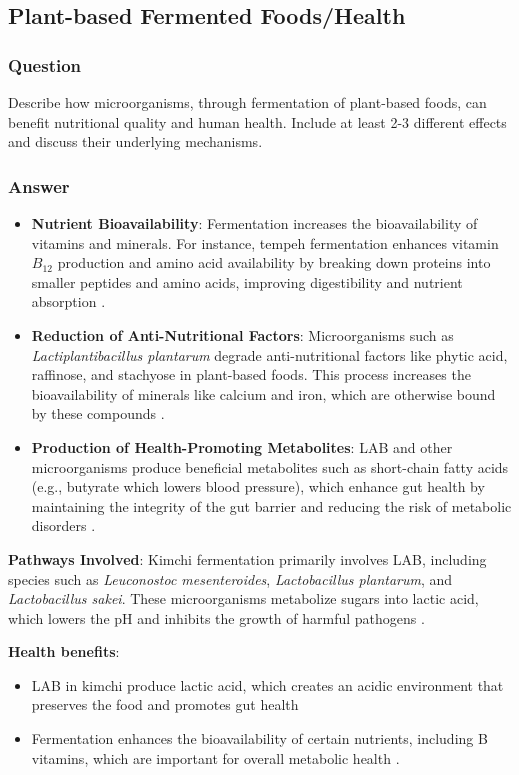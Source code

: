 \subsection{Plant-based Fermented Foods/Health}
\subsubsection*{Question}
Describe how microorganisms, through fermentation of plant-based foods, can benefit nutritional quality and human health. Include at least 2-3 different effects and discuss their underlying mechanisms. 

\subsubsection*{Answer}
\begin{itemize}
    \item \textbf{Nutrient Bioavailability}: Fermentation increases the bioavailability of vitamins and minerals. For instance, tempeh fermentation enhances vitamin $B_{12}$ production and amino acid availability by breaking down proteins into smaller peptides and amino acids, improving digestibility and nutrient absorption \cite*{LS22}.
    \item \textbf{Reduction of Anti-Nutritional Factors}: Microorganisms such as \textit{Lactiplantibacillus plantarum} degrade anti-nutritional factors like phytic acid, raffinose, and stachyose in plant-based foods. This process increases the bioavailability of minerals like calcium and iron, which are otherwise bound by these compounds \cite*{LS22}.
    \item \textbf{Production of Health-Promoting Metabolites}: LAB and other microorganisms produce beneficial metabolites such as short-chain fatty acids (e.g., butyrate which lowers blood pressure), which enhance gut health by maintaining the integrity of the gut barrier and reducing the risk of metabolic disorders \cite*{LS22,LS19}.
\end{itemize}

\textbf{Pathways Involved}: Kimchi fermentation primarily involves LAB, including species such as \textit{Leuconostoc mesenteroides}, \textit{Lactobacillus plantarum}, and \textit{Lactobacillus sakei}. These microorganisms metabolize sugars into lactic acid, which lowers the pH and inhibits the growth of harmful pathogens \cite*{LS14}.

\textbf{Health benefits}:
\begin{itemize}
    \item LAB in kimchi produce lactic acid, which creates an acidic environment that preserves the food and promotes gut health \cite*{LS14}
    \item Fermentation enhances the bioavailability of certain nutrients, including B vitamins, which are important for overall metabolic health \cite*{LS19}.
\end{itemize}

